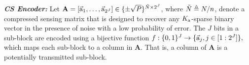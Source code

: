 \documentclass{article}
\begin{document}
\begin{comment}
\subsubsection{Random Interleaver}
\label{RandIinter}
The $M$ bit binary vector output by the tree encoder for each user is interleaved using a random permutation matrix $\mathbf{\Pi}$ which is common across all the users and known at the receiver. This is done to enforce randomness at sub-block level. Let $\vec{u}_{k}^{(i)}$ denote the $J$ length binary vector that corresponds to the $i^{\text{th}}$ sub-block of the active user $k$ output by the random interleaver. Then, it is reasonable to assume that the set of vectors $\{\vec{u}_{k}^{(i)}: k \in \mathbf{S}_\textbf{a}\}$ behave like vectors selected uniformly at random from the space $\mathbb{F}_2^J$. 
\end{comment}

\textbf{\textit{CS Encoder:}} Let $\mathbf{A}=[\vec{\mathrm{a}}_1,\ldots,\vec{\mathrm{a}}_{2^J}] \in \{\pm \sqrt{P}\}^{\tilde{N}\times2^J}$, where $\tilde{N}\triangleq {N}/{n}$, denote a compressed sensing matrix that is designed to recover any $K_\mathrm{a}$-sparse binary vector in the presence of noise with a low probability of error.  The $J$ bits in a sub-block are encoded  using a bijective function $f:\{0,1\}^J \rightarrow \{\vec{\mathrm{a}}_j, j \in [1:2^J]\},$ which maps each sub-block to a column in $\mathbf{A}$.
That is, a column of $\mathbf{A}$ is a potentially transmitted sub-block.


\end{document}
